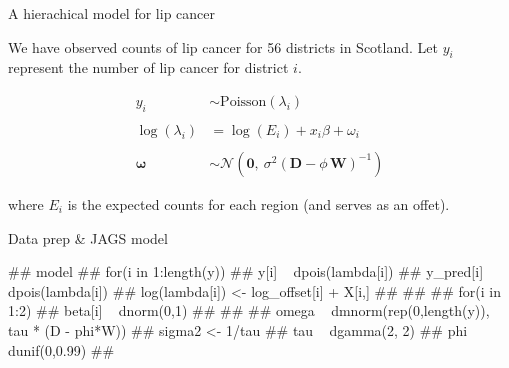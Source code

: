 \documentclass[11pt,ignorenonframetext,]{beamer}
\newenvironment{Shaded}{}{}
\newcommand{\KeywordTok}[1]{\textcolor[rgb]{0.00,0.44,0.13}{\textbf{#1}}}
\newcommand{\StringTok}[1]{\textcolor[rgb]{0.25,0.44,0.63}{#1}}
\newcommand{\OperatorTok}[1]{\textcolor[rgb]{0.40,0.40,0.40}{#1}}
\newcommand{\NormalTok}[1]{#1}
\let\oldShaded\Shaded
\let\endoldShaded\endShaded
\renewenvironment{Shaded}{\footnotesize\begin{spacing}{0.9}\oldShaded}{\endoldShaded\end{spacing}}
\let\oldverbatim\verbatim
\let\endoldverbatim\endverbatim
\renewenvironment{verbatim}{\footnotesize\begin{spacing}{0.9}\oldverbatim}{\endoldverbatim\end{spacing}}
\newcommand{\scriptoutput}{
  \renewenvironment{Shaded}{\scriptsize\begin{spacing}{0.9}\oldShaded}{\endoldShaded\end{spacing}}
  \renewenvironment{verbatim}{\scriptsize\begin{spacing}{0.9}\oldverbatim}{\endoldverbatim\end{spacing}}
}
\begin{document}
\begin{frame}[t]{A hierachical model for lip cancer}

We have observed counts of lip cancer for 56 districts in Scotland. Let
\(y_i\) represent the number of lip cancer for district \(i\).

\[\begin{aligned}
y_i &\sim \text{Poisson}(\lambda_i) \\
\\
\log(\lambda_i) &= \log(E_i) + x_i \beta + \omega_i \\
\\
\bm\omega &\sim \mathcal{N}(\bm{0},~\sigma^2(\bm{D}-\phi\,\bm{W})^{-1})
\end{aligned}\]

where \(E_i\) is the expected counts for each region (and serves as an
offet).

\end{frame}

\begin{frame}[fragile]{Data prep \& JAGS model}

\scriptoutput

\begin{Shaded}
\end{Shaded}

\begin{verbatim}
## model{
##   for(i in 1:length(y)) {
##     y[i] ~ dpois(lambda[i])
##     y_pred[i] ~ dpois(lambda[i])
##     log(lambda[i]) <- log_offset[i] + X[i,] %*% beta + omega[i]
##   }
## 
##   for(i in 1:2) {
##     beta[i] ~ dnorm(0,1)
##   }
## 
##   omega ~ dmnorm(rep(0,length(y)), tau * (D - phi*W))
##   sigma2 <- 1/tau
##   tau ~ dgamma(2, 2)
##   phi ~ dunif(0,0.99)
## }
\end{verbatim}

\end{frame}
\end{document}
